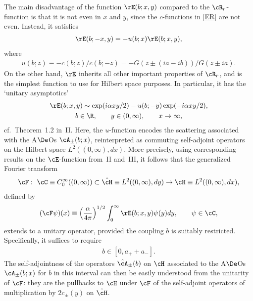 The main disadvantage of the function $\rE(b;x,y)$ compared to the $\cR_r$-function is that it is not even in $x$ and $y$, since the $c$-functions in \eqref{ER} are not even. Instead, it satisf\/ies
\begin{gather}\label{Erefl}
\rE(b;-x,y)=-u(b;x)\rE(b;x,y),
\end{gather}
where
\begin{gather}\label{u}
u(b;z)\equiv -c(b;z)/c(b;-z)=-G(z\pm (ia-ib))/G(z\pm ia).
\end{gather}
On the other hand, $\rE$ inherits all other important properties of $\cR_r$, and is the simplest function to use for Hilbert space purposes. In particular, it has the `unitary asymptotics'
\begin{gather}\label{Eas}
\rE(b;x,y)\sim \exp(i\alpha xy/2)- u(b;-y)\exp(-i\alpha xy/2),\\
 b\in\R,\qquad y\in(0,\infty), \qquad x\to \infty,\nonumber
\end{gather}
cf.~Theorem~1.2 in~II. Here, the $u$-function
encodes the scattering associated with the A$\De$Os $\cA_{\pm}(b;x)$, reinterpreted as commuting self-adjoint operators on the Hilbert space $L^2((0,\infty),dx)$. More precisely, using corresponding results on the $\cE$-function from~II and~III, it follows that the generalized Fourier
transform
\begin{gather}\label{cF}
\cF
  : \ \cC\equiv C_0^{\infty}((0,\infty))\subset \hat{\cH}\equiv L^2((0,\infty),dy) \to\cH
\equiv L^2((0,\infty),dx),
\end{gather}
def\/ined by
\begin{gather}\label{cFE}
(\cF\psi)(x)\equiv\left(\frac{\alpha}{4\pi}\right)^{1/2}\int_0^{\infty}\rE(b;x,y)\psi(y)dy,\qquad
\psi\in\cC,
\end{gather}
extends to a unitary operator, provided the coupling $b$ is suitably restricted. Specif\/ically, it suf\/f\/ices to require
\begin{gather}\label{bres}
b\in [0,a_{+}+a_{-}].
\end{gather}
The self-adjointness of the operators $\hat{\cA}_{\pm}(b)$ on $\cH$ associated to the A$\De$Os $\cA_{\pm}(b;x)$ for $b$ in this interval can then be easily understood from the unitarity of $\cF$: they are the pullbacks to $\cH$ under $\cF$ of the self-adjoint operators of multiplication by $2c_{\pm}(y)$ on $\hat{\cH}$.

